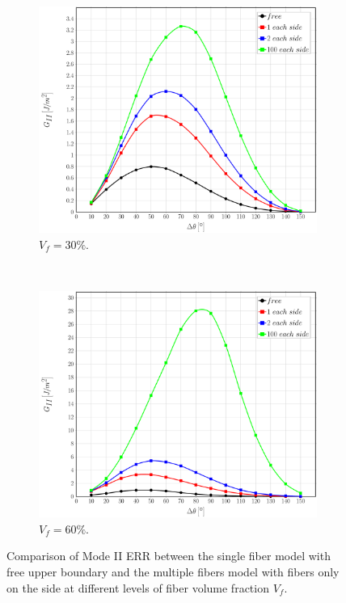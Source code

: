 \documentclass[review]{elsarticle}
\begin{document}
\begin{figure}[!h]
\centering
    \begin{subfigure}[b]{0.475\textwidth}
        \includegraphics[width=\textwidth]{comparefreesidefibers-vf30-GII.pdf}
        \caption{$V_{f}=30\%$.}\label{subfig:comparisonfree30MII}
    \end{subfigure} ~
    \begin{subfigure}[b]{0.475\textwidth}
        \includegraphics[width=\textwidth]{comparefreesidefibers-vf60-GII.pdf}
        \caption{$V_{f}=60\%$.}\label{subfig:comparisonfree60MII}
    \end{subfigure}

\caption{Comparison of Mode II ERR between the single fiber model with free upper boundary and the multiple fibers model with fibers only on the side at different levels of fiber volume fraction $V_{f}$.}\label{fig:comparisonfreeMII}
\end{figure}
\end{document}
